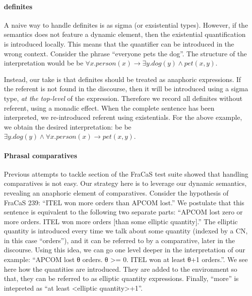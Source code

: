 \documentclass{article}
\begin{document}
\paragraph{definites} A naive way to handle definites is as sigma (or
exsistential types).  However, if the semantics
does not feature a dynamic element, then the existential
quantification is introduced locally. This means that the quantifier
can be introduced in the wrong context. Consider the phrase
``everyone pets the dog''. The structure of the interpretation would
be be $∀x. person(x) → ∃y. dog(y) ∧ pet(x,y)$.

Instead, our take is that definites should be treated as anaphoric
expressions. If the referent is not found in the discourse, then it
will be introduced using a sigma type, \emph{at the top-level} of
the expression. Therefore we record all definites without referent,
using a monadic effect. When the complete sentence has been
interpreted, we re-introduced referent using existentials. For the
above example, we obtain the desired interpretation:
be be $∃y. dog(y) ∧ ∀x. person(x) → pet(x,y)$.

\paragraph{Phrasal comparatives}
Previous attempts to tackle section of the FraCaS test suite showed
that handling comparatives is not easy. Our strategy here is to
leverage our dynamic semantics, revealing an anaphoric element of
comparatives. Consider the hypothesis of FraCaS 239: ``ITEL won more
orders than APCOM lost.''  We postulate that this sentence is
equivalent to the following two separate parts: ``APCOM lost zero or
more orders. ITEL won more orders [than some elliptic quantity].''
The elliptic quantity is introduced every time we talk about some
quantity (indexed by a CN, in this case ``orders''), and it can be
referred to by a comparative, later in the discourse. Using this idea,
we can go one level deeper in the interpretation of our example:
``APCOM lost θ orders. θ >= 0.  ITEL won at least θ+1 orders.''. We
see here how the quantities are introduced. They are added to the
environment so that, they can be referred to as elliptic quantity
expressions. Finally, ``more'' is intepreted as ``at least <elliptic
quantity>+1''.
\end{document}
